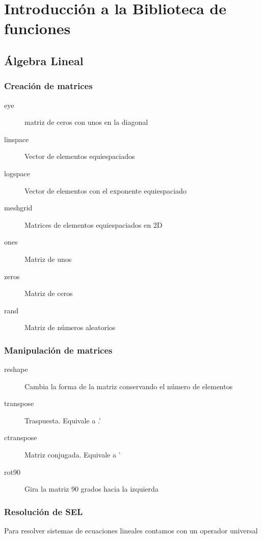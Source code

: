 \documentclass[12pt]{beamer}
\begin{document}
\section{Introducción a la Biblioteca de funciones}

\subsection{Álgebra Lineal}
\begin{frame}
\frametitle{Creación de matrices}
\begin{description}
\item[eye] matriz de ceros con unos en la diagonal
\item[linspace] Vector de elementos equiespaciados
\item[logspace] Vector de elementos con el exponente equiespaciado
\item[meshgrid] Matrices de elementos equiespaciados en 2D
\item[ones] Matriz de unos
\item[zeros] Matriz de ceros
\item[rand] Matriz de números aleatorios
\end{description}
\end{frame}

\begin{frame}
\frametitle{Manipulación de matrices}
\begin{description}
\item[reshape] Cambia la forma de la matriz conservando el número de
  elementos
\item[transpose] Traspuesta. Equivale a .'
\item[ctranspose] Matriz conjugada. Equivale a '
\item[rot90] Gira la matriz 90 grados hacia la izquierda
\end{description}
\end{frame}


\begin{frame}
\frametitle{Resolución de SEL}

Para resolver sistemas de ecuaciones lineales contamos con un operador
universal
\testcode
\end{frame}
\end{document}
